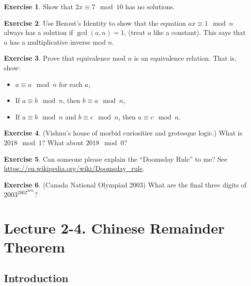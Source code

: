 \documentclass[11pt]{article}
\theoremstyle{definition}
\newtheorem{exercise}{Exercise}
\numberwithin{thm}{section}
\begin{document}
\begin{exercise} Show that $2x \equiv 7 \mod 10$ has no solutions.
\end{exercise}

\begin{exercise} Use Bezout's Identity to show that the equation $ax \equiv 1 \mod n$ always has a solution if $\gcd(a,n) = 1$, (treat $a$ like a constant). This says that $a$ has a multiplicative inverse mod $n$.
\end{exercise}

\begin{exercise} Prove that equivalence mod $n$ is an equivalence relation. That is, show:
\begin{itemize}
	\item $a \equiv a \mod n$ for each $a$,
    \item If $a \equiv b \mod n$, then $b \equiv a \mod n$,
    \item If $a \equiv b \mod n$ and $b \equiv c \mod n$, then $a \equiv c \mod n$.
\end{itemize}
\end{exercise}

\begin{exercise} (Vishnu's house of morbid curiosities and grotesque logic.) What is $2018 \mod 1$? What about $2018 \mod 0$?
\end{exercise}

\begin{exercise} Can someone please explain the ``Doomsday Rule'' to me? See \url{https://en.wikipedia.org/wiki/Doomsday_rule}.
\end{exercise}

\begin{exercise} (Canada National Olympiad 2003) What are the final three digits of $2003^{2002^{2001}}$?
\end{exercise}


\newpage
\section{Lecture 2-4. Chinese Remainder Theorem}



\subsection{Introduction}
\end{document}
